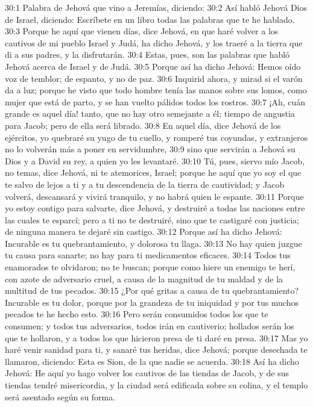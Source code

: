 30:1 Palabra de Jehová que vino a Jeremías, diciendo: 
30:2 Así habló Jehová Dios de Israel, diciendo: Escríbete en un libro todas las palabras que te he hablado. 
30:3 Porque he aquí que vienen días, dice Jehová, en que haré volver a los cautivos de mi pueblo Israel y Judá, ha dicho Jehová, y los traeré a la tierra que di a sus padres, y la disfrutarán. 
30:4 Estas, pues, son las palabras que habló Jehová acerca de Israel y de Judá. 
30:5 Porque así ha dicho Jehová: Hemos oído voz de temblor; de espanto, y no de paz. 
30:6 Inquirid ahora, y mirad si el varón da a luz; porque he visto que todo hombre tenía las manos sobre sus lomos, como mujer que está de parto, y se han vuelto pálidos todos los rostros. 
30:7 ¡Ah, cuán grande es aquel día! tanto, que no hay otro semejante a él; tiempo de angustia para Jacob; pero de ella será librado. 
30:8 En aquel día, dice Jehová de los ejércitos, yo quebraré su yugo de tu cuello, y romperé tus coyundas, y extranjeros no lo volverán más a poner en servidumbre, 
30:9 sino que servirán a Jehová su Dios y a David su rey, a quien yo les levantaré. 
30:10 Tú, pues, siervo mío Jacob, no temas, dice Jehová, ni te atemorices, Israel; porque he aquí que yo soy el que te salvo de lejos a ti y a tu descendencia de la tierra de cautividad; y Jacob volverá, descansará y vivirá tranquilo, y no habrá quien le espante. 
30:11 Porque yo estoy contigo para salvarte, dice Jehová, y destruiré a todas las naciones entre las cuales te esparcí; pero a ti no te destruiré, sino que te castigaré con justicia; de ninguna manera te dejaré sin castigo. 
30:12 Porque así ha dicho Jehová: Incurable es tu quebrantamiento, y dolorosa tu llaga. 
30:13 No hay quien juzgue tu causa para sanarte; no hay para ti medicamentos eficaces. 
30:14 Todos tus enamorados te olvidaron; no te buscan; porque como hiere un enemigo te herí, con azote de adversario cruel, a causa de la magnitud de tu maldad y de la multitud de tus pecados. 
30:15 ¿Por qué gritas a causa de tu quebrantamiento? Incurable es tu dolor, porque por la grandeza de tu iniquidad y por tus muchos pecados te he hecho esto. 
30:16 Pero serán consumidos todos los que te consumen; y todos tus adversarios, todos irán en cautiverio; hollados serán los que te hollaron, y a todos los que hicieron presa de ti daré en presa. 
30:17 Mas yo haré venir sanidad para ti, y sanaré tus heridas, dice Jehová; porque desechada te llamaron, diciendo: Esta es Sion, de la que nadie se acuerda. 
30:18 Así ha dicho Jehová: He aquí yo hago volver los cautivos de las tiendas de Jacob, y de sus tiendas tendré misericordia, y la ciudad será edificada sobre su colina, y el templo será asentado según su forma. 
